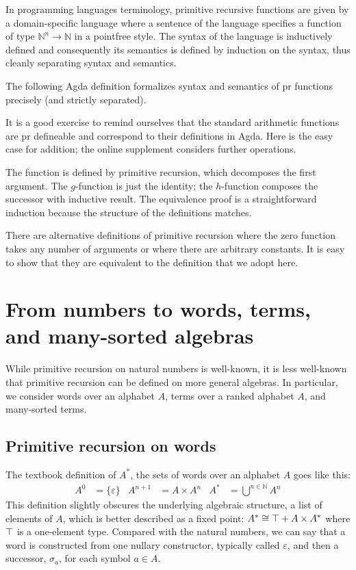 \documentclass{jfp}
\begin{document}
In programming languages terminology, primitive
recursive functions are given by a domain-specific language where a
sentence of the language specifies a function of type ${ℕ}^n \to {ℕ}$
in a pointfree style. The syntax of the language is inductively
defined and consequently its semantics is defined by induction on the
syntax, thus cleanly separating syntax and semantics.

The following Agda definition formalizes syntax and semantics of pr
functions precisely (and strictly separated).


It is a good exercise to remind ourselves that the standard arithmetic
functions are pr defineable and correspond to their definitions in
Agda. Here is the easy case for addition; the online supplement
considers further operations. 

The function  is defined by primitive recursion, which
decomposes the first argument. The $g$-function is just the identity;
the $h$-function composes the successor with inductive result.
The equivalence proof is a
straightforward induction because the structure of the definitions
matches.

There are alternative definitions of primitive recursion where the
zero function takes any number of arguments or where there are
arbitrary constants. It is easy to show that they are equivalent to
the definition that we adopt here.

\section{From numbers to words, terms, and many-sorted algebras}
\label{sec:from-numbers-words}

While primitive recursion on natural numbers is well-known, it is less
well-known that primitive recursion can be defined on more general
algebras. In particular, we consider words over an alphabet $A$, terms
over a ranked alphabet $A$, and many-sorted terms. 

\subsection{Primitive recursion on words}
\label{sec:prim-recurs-words}

The textbook definition of $A^*$, the sets of words over an alphabet $A$ goes like this:
\begin{align*}
  A^0 &= \{ \varepsilon \} & A^{n+1} &= A \times A^n & A^* &=
  \bigcup^{n \in ℕ} A^n
\end{align*}
This definition slightly obscures the underlying algebraic structure, a list of
elements of $A$, which is better described as a fixed point:
$A^*\cong \ATop + A \times A^*$ where $\ATop$ is a one-element type.
Compared with the natural numbers, we can say that a word is
constructed from one nullary constructor, typically called
$\varepsilon$, and then a successor, $\sigma_a$, for each symbol $a\in A$.
\end{document}
